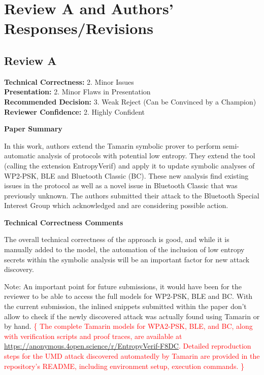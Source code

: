 \documentclass{article}
\newcommand{\response}[1]{\textcolor{red}{\{#1\}}}
\begin{document}
\section{Review A and Authors' Responses/Revisions}
\subsection{Review A}

\noindent\textbf{Technical Correctness:} 2. Minor Issues\\
\textbf{Presentation:} 2. Minor Flaws in Presentation\\
\textbf{Recommended Decision:} 3. Weak Reject (Can be Convinced by a Champion)\\
\textbf{Reviewer Confidence:} 2. Highly Confident

\rule{0pt}{8pt}

\noindent\textbf{Paper Summary}

In this work, authors extend the Tamarin symbolic prover to perform semi-automatic analysis of protocols with potential low entropy.
They extend the tool (calling the extension EntropyVerif) and apply it to update symbolic analyses of WP2-PSK, BLE and Bluetooth Classic (BC).
These new analysis find existing issues in the protocol as well as a novel issue in Bluetooth Classic that was previously unknown.
The authors submitted their attack to the Bluetooth Special Interest Group which acknowledged and are considering possible action.

\rule{0pt}{8pt}

\noindent\textbf{Technical Correctness Comments}

The overall technical correctness of the approach is good, and while it is manually added to the model,
the automation of the inclusion of low entropy secrets within the symbolic analysis will be an important factor for new attack discovery.

Note: An important point for future submissions, it would have been for the reviewer to be able to access the full models for WP2-PSK, BLE and BC.
With the current submission, the inlined snippets submitted within the paper don't allow to check if the newly discovered attack was actually found using Tamarin or by hand.
\response{
    The complete Tamarin models for WPA2-PSK, BLE, and BC, along with verification scripts and proof traces, are available at \url{https://anonymous.4open.science/r/EntropyVerif-F8DC}.
    Detailed reproduction steps for the UMD attack discovered automatedly by Tamarin are provided in the repository's README, including environment setup, execution commands.
}
\end{document}

